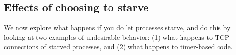 \subsection{Effects of choosing to starve}

We now explore what happens if you do let processes starve, and do this by
looking at two examples of undesirable behavior: (1) what happens to TCP
connections of starved processes, and (2) what happens to timer-based code.








